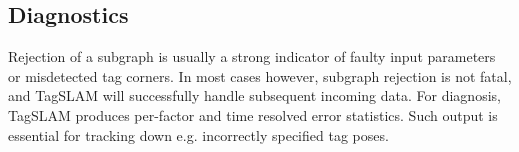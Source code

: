 \subsection{Diagnostics}
Rejection of a subgraph is usually a strong indicator of faulty input
parameters or misdetected tag corners. In most cases however, subgraph
rejection is not fatal, and TagSLAM will successfully handle
subsequent incoming data. For diagnosis, TagSLAM produces per-factor
and time resolved error statistics. Such output is essential for
tracking down e.g. incorrectly specified tag poses.
